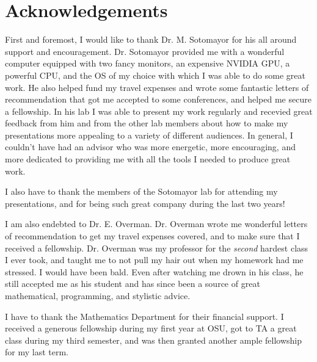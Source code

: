 \newpage
\setcounter{page}{4}
\section*{Acknowledgements}
        First and foremost, I would like to thank Dr. M. Sotomayor for his all around support and encouragement. Dr. Sotomayor provided me with a wonderful computer equipped with two fancy monitors, an expensive NVIDIA GPU, a powerful CPU, and the OS of my choice with which I was able to do some great work. He also helped fund my travel expenses and wrote some fantastic letters of recommendation that got me accepted to some conferences, and helped me secure a fellowship. In his lab I was able to present my work regularly and recevied great feedback from him and from the other lab members about how to make my presentations more appealing to a variety of different audiences. In general, I couldn't have had an advisor who was more energetic, more encouraging, and more dedicated to providing me with all the tools I  needed to produce great work.

        I also have to thank the members of the Sotomayor lab for attending my presentations, and for being such great company during the last two years!

        I am also endebted to Dr. E. Overman. Dr. Overman wrote me wonderful letters of recommendation to get my travel expenses covered, and to make sure that I received a fellowship. Dr. Overman was my professor for the \emph{second} hardest class I ever took, and taught me to not pull my hair out when my homework had me stressed. I would have been bald. Even after watching me drown in his class, he still accepted me as his student and has since been a source of great mathematical, programming, and stylistic advice.

        I have to thank the Mathematics Department for their financial support. I received a generous fellowship during my first year at OSU, got to TA a great class during my third semester, and was then granted another ample fellowship for my last term. 

        
